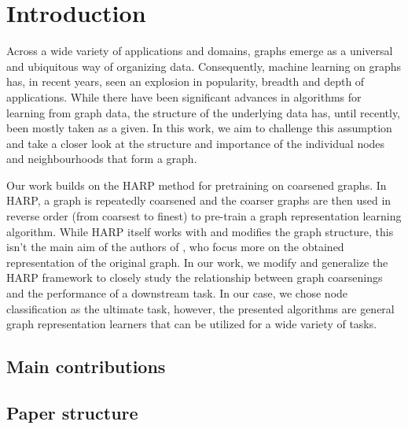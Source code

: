 \section{Introduction}
Across a wide variety of applications and domains, graphs emerge as a universal and ubiquitous way of organizing data. Consequently, machine learning on graphs has, in recent years, seen an explosion in popularity, breadth and depth of applications. While there have been significant advances in algorithms for learning from graph data, the structure of the underlying data has, until recently, been mostly taken as a given. In this work, we aim to challenge this assumption and take a closer look at the structure and importance of the individual nodes and neighbourhoods that form a graph.

Our work builds on the HARP \cite{chen_harp_2018} method for pretraining on coarsened graphs. In HARP, a graph is repeatedly coarsened and the coarser graphs are then used in reverse order (from coarsest to finest) to pre-train a graph representation learning algorithm. While HARP itself works with and modifies the graph structure, this isn't the main aim of the authors of \cite{chen_harp_2018}, who focus more on the obtained representation of the original graph. In our work, we modify and generalize the HARP framework to closely study the relationship between graph coarsenings and the performance of a downstream task. In our case, we chose node classification as the ultimate task, however, the presented algorithms are general graph representation learners that can be utilized for a wide variety of tasks.

\subsection{Main contributions}

\subsection{Paper structure}
